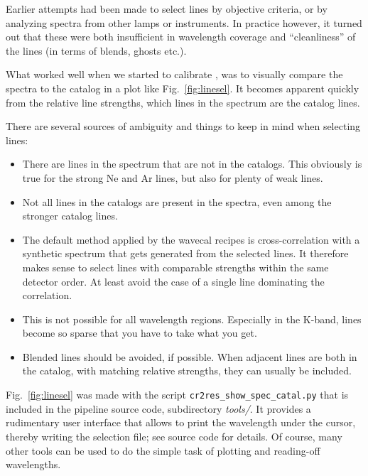 Earlier attempts had been made to select lines by objective criteria, or by
analyzing spectra from other lamps or instruments. In practice however, it
turned out that these were both insufficient in wavelength coverage and
``cleanliness'' of the lines (in terms of blends, ghosts etc.). 

What worked well when we started to calibrate \instrument , was to visually
compare the spectra to the catalog in a plot like Fig.~\ref{fig:linesel}. It
becomes apparent quickly from the relative line strengths, which lines in the
spectrum are the catalog lines.

There are several sources of ambiguity and things to keep in mind when selecting lines:

\begin{itemize}
    \item There are lines in the spectrum that are not in the catalogs. This obviously is true for the strong Ne and Ar lines, but also for plenty of weak lines.
    \item Not all lines in the catalogs are present in the spectra, even among the stronger catalog lines.
    \item The default method applied by the wavecal recipes is cross-correlation with a synthetic spectrum that gets generated from the selected lines. It therefore makes sense to select lines with comparable strengths within the same detector order. At least avoid the case of a single line dominating the correlation.
    \item This is not possible for all wavelength regions. Especially in the K-band, lines become so sparse that you have to take what you get.
    \item Blended lines should be avoided, if possible. When adjacent lines are both in the catalog, with matching relative strengths, they can usually be included.
\end{itemize}


Fig.~\ref{fig:linesel} was made with the script \linebreak
\verb#cr2res_show_spec_catal.py# that is included in the pipeline source code,
subdirectory \emph{tools/}. It provides a rudimentary user interface that allows
to print the wavelength under the cursor, thereby writing the selection file;
see source code for details. Of course, many other tools can be used to do
the simple task of plotting and reading-off wavelengths.